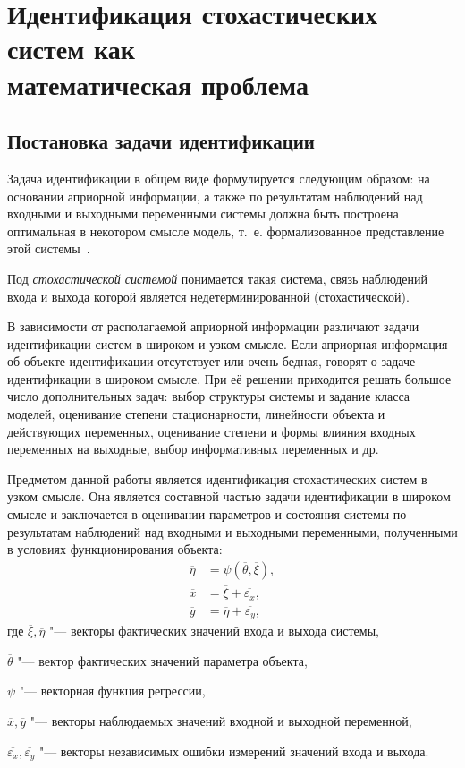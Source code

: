 \section[Идентификация стохастических систем как математическая проблема]{%
  Идентификация стохастических систем как \\
  математическая проблема}

\subsection{Постановка задачи идентификации}

Задача идентификации в общем виде формулируется следующим образом:
на основании априорной информации, а также по результатам наблюдений над
входными и выходными переменными системы должна быть построена оптимальная в
некотором смысле модель, т.~е. формализованное представление этой системы~\cite{eikhoff_1975}.

Под \emph{стохастической системой} понимается такая система,
связь наблюдений входа и выхода которой является недетерминированной (стохастической).

В зависимости от располагаемой априорной информации различают
задачи идентификации систем в широком и узком смысле.
Если априорная информация об объекте идентификации отсутствует
или очень бедная, говорят о задаче идентификации в широком смысле.
При её решении приходится решать большое число дополнительных задач:
выбор структуры системы и задание класса моделей,
оценивание степени стационарности, линейности объекта и действующих переменных,
оценивание степени и формы влияния входных переменных на выходные,
выбор информативных переменных и др.

Предметом данной работы является идентификация стохастических систем в узком смысле.
Она является составной частью задачи идентификации в широком смысле
и заключается в оценивании параметров и состояния системы по результатам
наблюдений над входными и выходными переменными, полученными в условиях функционирования объекта:
\begin{equation}
  \label{eq:model_general}
  \begin{aligned}
    \overline{\eta} &= \psi (\overline{\theta}, \overline{\xi}), \\
    \overline{x} &= \overline{\xi} + \overline{\varepsilon_x}, \\
    \overline{y} &= \overline{\eta} + \overline{\varepsilon_y},
  \end{aligned}
\end{equation}
где \( \overline{\xi}, \overline{\eta} \) "--- векторы фактических значений входа и выхода системы, \par
\( \overline{\theta} \) "--- вектор фактических значений параметра объекта, \par
\( \psi \) "--- векторная функция регрессии, \par
\( \overline{x}, \overline{y} \) "--- векторы наблюдаемых значений входной и выходной переменной, \par
\( \overline{\varepsilon_x}, \overline{\varepsilon_y} \) "--- векторы независимых ошибки измерений значений входа и выхода.

